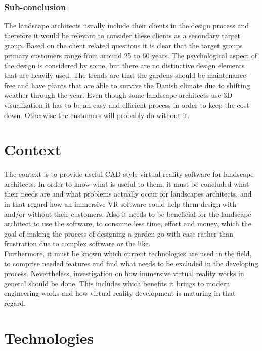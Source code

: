 \subsubsection{Sub-conclusion}
The landscape architects usually include their clients in the design process and therefore it would be relevant to consider these clients as a secondary target group. Based on the client related questions it is clear that the target groups primary customers range from around 25 to 60 years. The psychological aspect of the design is considered by some, but there are no distinctive design elements that are heavily used. The trends are that the gardens should be maintenance-free and have plants that are able to survive the Danish climate due to shifting weather through the year. Even though some landscape architects use 3D visualization it has to be an easy and efficient process in order to keep the cost down. Otherwise the customers will probably do without it.


\section{Context}
The context is to provide useful CAD style virtual reality software for landscape architects. In order to know what is useful to them, it must be concluded what their needs are and what problems actually occur for landscapes architects, and in that regard how an immersive VR software could help them design with and/or without their customers. Also it needs to be beneficial for the landscape architect to use the software, to consume less time, effort and money, which the goal of making the process of designing a garden go with ease rather than frustration due to complex software or the like. \\

Furthermore, it must be known which current technologies are used in the field, to comprise needed features and find what needs to be excluded in the developing process. Nevertheless, investigation on how immersive virtual reality works in general should be done. This includes which benefits it brings to modern engineering works and how virtual reality development is maturing in that regard.

\section{Technologies}\label{sec:technologies}			

